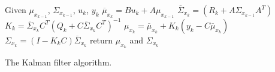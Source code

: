 \begin{algorithm}[tbh]
  Given $\mu_{x_{k-1}}$, $\Sigma_{x_{k-1}}$, $u_k$, $y_k$ \;
  $\overline{\mu}_{x_k} = Bu_k + A\mu_{x_{k-1}}$\;
  $\overline{\Sigma}_{x_k} = (R_k + A\Sigma_{x_{k-1}}A^T)$\;
  $ K_k=\overline{\Sigma}_{x_k} C^T (Q_k + C\overline{\Sigma}_{x_k}C^T)^{-1}$\;
  $\mu_{x_{k}} =\overline{\mu}_{x_k} + K_k(y_k-C\overline{\mu}_{x_k})$\;
  $\Sigma_{x_k} = (I-K_kC)\overline{\Sigma}_{x_k} $\;
  return $\mu_{x_{k}}$ and $\Sigma_{x_k}$\;
  \caption{The Kalman filter algorithm.}
  \label{alg:kf}
\end{algorithm}



















